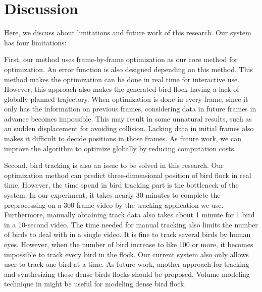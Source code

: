 \chapter{Discussion}








Here, we discuss about limitations and future work of this research. Our system has four limitations:


First, our method uses frame-by-frame optimization as our core method for optimization. An error function is also designed depending on this method. This method makes the optimization can be done in real time for interactive use. However, this approach also makes the generated bird flock having a lack of globally planned trajectory. When optimization is done in every frame, since it only has the information on previous frames, considering data in future frames in advance becomes impossible. This may result in some unnatural results, such as an sudden displacement for avoiding collision. Lacking data in initial frames also makes it difficult to decide positions in those frames. As future work, we can improve the algorithm to optimize globally by reducing computation costs.


Second, bird tracking is also an issue to be solved in this research. Our optimization method can predict three-dimensional position of bird flock in real time. However, the time spend in bird tracking part is the bottleneck of the system. In our experiment, it takes nearly 30 minutes to complete the preprocessing on a 300-frame video by the tracking application we use. Furthermore, manually obtaining track data also takes about 1 minute for 1 bird in a 10-second video. The time needed for manual tracking also limits the number of birds to deal with in a single video. It is fine to track several birds by human eyes. However, when the number of bird increase to like 100 or more, it becomes impossible to track every bird in the flock. Our current system also only allows user to track one bird at a time. As future work, another approach for tracking and synthesizing these dense birds flocks should be proposed. Volume modeling technique in \cite{Fluid} might be useful for modeling dense bird flock.



